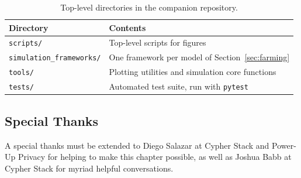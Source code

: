 \begin{table}[htbp]
\centering
\begin{tabular}{ll}
\hline
Directory & Contents \\
\hline
\texttt{scripts/}               & Top-level scripts for figures \\
\texttt{simulation\_frameworks/}& One framework per model of Section~\ref{sec:farming} \\
\texttt{tools/}                 & Plotting utilities and simulation core functions \\
\texttt{tests/}                 & Automated test suite, run with \texttt{pytest} \\
\hline
\end{tabular}
\caption{Top-level directories in the companion repository.}
\label{tab:repo_layout}
\end{table}





\subsection*{Special Thanks}
A special thanks must be extended to Diego Salazar at Cypher Stack and Power-Up Privacy for helping to make this chapter possible, as well as Joshua Babb at Cypher Stack for myriad helpful conversations.
